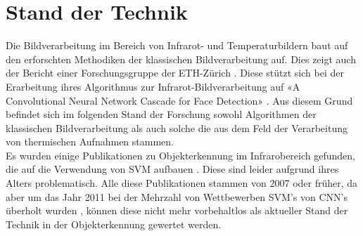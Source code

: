 \chapter{Stand der Technik}
\label{ch:StandDerTechnik}

Die Bildverarbeitung im Bereich von Infrarot- und Temperaturbildern baut auf den erforschten Methodiken der klassischen Bildverarbeitung auf. Dies zeigt auch der Bericht einer Forschungsgruppe der ETH-Zürich\parencite{gomez2018thermal} . Diese stützt sich bei der Erarbeitung ihres Algorithmus zur Infrarot-Bildverarbeitung auf «A Convolutional Neural Network Cascade for Face Detection»\parencite{li2015convolutional} . Aus diesem Grund befindet sich im folgenden Stand der Forschung sowohl Algorithmen der klassischen Bildverarbeitung als auch solche die aus dem Feld der Verarbeitung von thermischen Aufnahmen stammen.\\
Es wurden einige Publikationen zu Objekterkennung im Infrarobereich gefunden, die auf die Verwendung von \gls{SVM} aufbauen \parencite{suard2006pedestrian, bertozzi2003pedestrian, zhang2007pedestrian}. Diese sind leider aufgrund ihres Alters problematisch. Alle diese Publikationen stammen von 2007 oder früher, da aber um das Jahr 2011 bei der Mehrzahl von Wettbewerben \gls{SVM}'s von \gls{CNN}'s überholt wurden \parencite{Historyo5:online}, können diese nicht mehr vorbehaltlos als aktueller Stand der Technik in der Objekterkennung gewertet werden.

